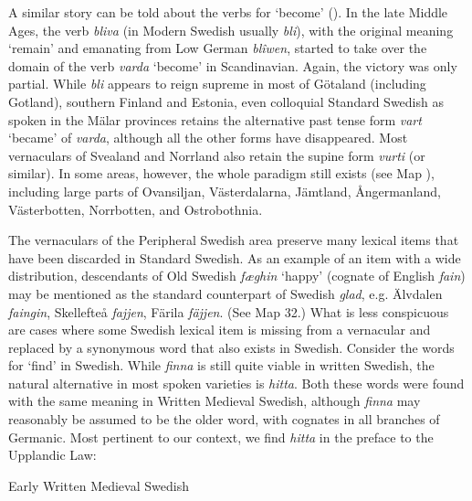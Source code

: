 \begin{styleBodytextC}
A similar story can be told about the verbs for ‘become’ (\citet{Markey1969}). In the late Middle Ages, the verb \textit{bliva }(in Modern Swedish usually \textit{bli}), with the original meaning ‘remain’ and emanating from Low German \textit{blîwen}, started to take over the domain of the verb \textit{varda} ‘become’ in Scandinavian. Again, the victory was only partial. While \textit{bli }appears to reign supreme in most of Götaland (including Gotland), southern Finland and Estonia, even colloquial Standard Swedish as spoken in the Mälar provinces retains the alternative past tense form \textit{vart} ‘became’ of \textit{varda}, although all the other forms have disappeared. Most vernaculars of Svealand and Norrland also retain the supine form \textit{vurti} (or similar). In some areas, however, the whole paradigm still exists (see Map ), including large parts of Ovansiljan, Västerdalarna, Jämtland, Ångermanland, Västerbotten, Norrbotten, and Ostrobothnia.

\end{styleBodytextC}

\begin{styleBodytextC}
The vernaculars of the Peripheral Swedish area preserve many lexical items that have been discarded in Standard Swedish. As an example of an item with a wide distribution, descendants of Old Swedish \textit{fæghin }‘happy’ (cognate of English \textit{fain}) may be mentioned as the standard counterpart of Swedish \textit{glad}, e.g. Älvdalen \textit{faingin}, Skellefteå \textit{fajjen}, Färila \textit{fäjjen}. (See Map 32.) What is less conspicuous are cases where some Swedish lexical item is missing from a vernacular and replaced by a synonymous word that also exists in Swedish. Consider the words for ‘find’ in Swedish. While \textit{finna }is still quite viable in written Swedish, the natural alternative in most spoken varieties is \textit{hitta}. Both these words were found with the same meaning in Written Medieval Swedish, although \textit{finna} may reasonably be assumed to be the older word, with cognates in all branches of Germanic. Most pertinent to our context, we find \textit{hitta} in the preface to the Upplandic Law:

\end{styleBodytextC}

\begin{listWWNumileveli}
\item 

\begin{styleExample}
Early Written Medieval Swedish

\end{styleExample}

\end{listWWNumileveli}

